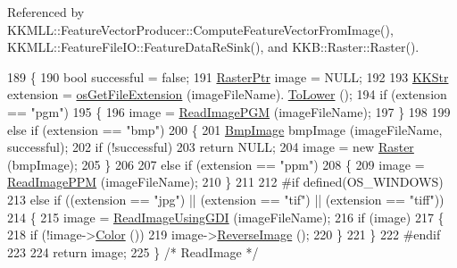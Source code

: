 Referenced by K\+K\+M\+L\+L\+::\+Feature\+Vector\+Producer\+::\+Compute\+Feature\+Vector\+From\+Image(), K\+K\+M\+L\+L\+::\+Feature\+File\+I\+O\+::\+Feature\+Data\+Re\+Sink(), and K\+K\+B\+::\+Raster\+::\+Raster().


\begin{DoxyCode}
189 \{
190   \textcolor{keywordtype}{bool}  successful = \textcolor{keyword}{false};
191   \hyperlink{class_k_k_b_1_1_raster}{RasterPtr}  image = NULL;
192 
193   \hyperlink{class_k_k_b_1_1_k_k_str}{KKStr}  extension = \hyperlink{namespace_k_k_b_ac66b0fee156008ea19ba4a0068378743}{osGetFileExtension} (imageFileName).
      \hyperlink{class_k_k_b_1_1_k_k_str_a4ccb635ec40c006f2bc2635958d41f5b}{ToLower} ();
194   \textcolor{keywordflow}{if}  (extension == \textcolor{stringliteral}{"pgm"})
195   \{
196     image = \hyperlink{namespace_k_k_b_a48f622be009a3055d0b86d20adf0d6d3}{ReadImagePGM} (imageFileName);
197   \}
198 
199   \textcolor{keywordflow}{else} \textcolor{keywordflow}{if}  (extension == \textcolor{stringliteral}{"bmp"})
200   \{
201     \hyperlink{class_k_k_b_1_1_bmp_image}{BmpImage}  bmpImage (imageFileName, successful);
202     \textcolor{keywordflow}{if}  (!successful)
203       \textcolor{keywordflow}{return}  NULL;
204     image = \textcolor{keyword}{new} \hyperlink{class_k_k_b_1_1_raster}{Raster} (bmpImage);
205   \}
206 
207   \textcolor{keywordflow}{else} \textcolor{keywordflow}{if}  (extension == \textcolor{stringliteral}{"ppm"})
208   \{
209     image = \hyperlink{namespace_k_k_b_a722a5b8c478ea435da42d7ac35a50625}{ReadImagePPM} (imageFileName);
210   \}
211 
212 \textcolor{preprocessor}{#if  defined(OS\_WINDOWS)}
213   \textcolor{keywordflow}{else} \textcolor{keywordflow}{if}  ((extension == \textcolor{stringliteral}{"jpg"})  ||  (extension == \textcolor{stringliteral}{"tif"})  ||  (extension == \textcolor{stringliteral}{"tiff"}))
214   \{
215     image = \hyperlink{namespace_k_k_b_a9e18a731c85527473c3f48c65ccb379e}{ReadImageUsingGDI} (imageFileName);
216     \textcolor{keywordflow}{if}  (image)
217     \{
218       \textcolor{keywordflow}{if}  (!image->\hyperlink{class_k_k_b_1_1_raster_a644248f99009d64ac4b8fef4a22aff25}{Color} ())
219         image->\hyperlink{class_k_k_b_1_1_raster_a6bd18a014fd3867714e04c037f021497}{ReverseImage} ();
220     \}
221   \}
222 \textcolor{preprocessor}{#endif}
223 
224   \textcolor{keywordflow}{return}  image;
225 \}  \textcolor{comment}{/* ReadImage */}
\end{DoxyCode}

